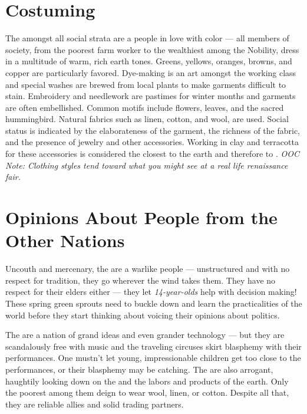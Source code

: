 \documentclass[blue]{GL2020}
\begin{document}
\section*{Costuming}
The \pFarm{} amongst all social strata are a people in love with color — all members of society, from the poorest farm worker to the wealthiest among the Nobility, dress in a multitude of warm, rich earth tones. Greens, yellows, oranges, browns, and copper are particularly favored. Dye-making is an art amongst the working class and special washes are brewed from local plants to make garments difficult to stain. Embroidery and needlework are pastimes for winter months and garments are often embellished.  Common motifs include flowers, leaves, and the sacred hummingbird. Natural fabrics such as linen, cotton, and wool, are used. Social status is indicated by the elaborateness of the garment, the richness of the fabric, and the presence of jewelry and other accessories. Working in clay and terracotta for these accessories is considered the closest to the earth and therefore to \cFarmGod{}. \emph{OOC Note: Clothing styles tend toward what you might see at a real life renaissance fair.}

\section*{Opinions About People from the Other Nations}
Uncouth and mercenary, the \pShippies{} are a warlike people — unstructured and with no respect for tradition, they go wherever the wind takes them. They have no respect for their elders either — they let \emph{14-year-olds} help with decision making! These spring green sprouts need to buckle down and learn the practicalities of the world before they start thinking about voicing their opinions about politics.

The \pTech{} are a nation of grand ideas and even grander technology — but they are scandalously free with music and the traveling circuses skirt blasphemy with their performances. One mustn’t let young, impressionable children get too close to the performances, or their blasphemy may be catching. The \pTech{} are also arrogant, haughtily looking down on the \pFarm{} and the labors and products of the earth. Only the poorest among them deign to wear wool, linen, or cotton. Despite all that, they are reliable allies and solid trading partners.  
\end{document}
